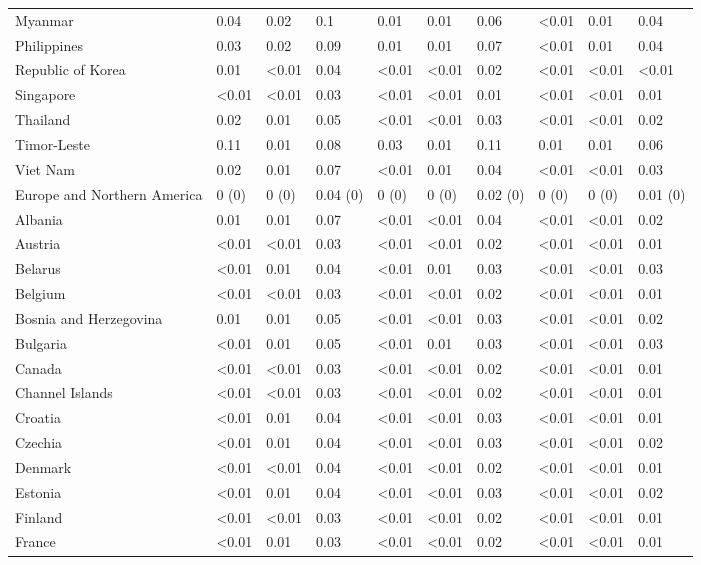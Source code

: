 \begin{longtable}[t]{llllllllll}
Myanmar & 0.04 & 0.02 & 0.1 & 0.01 & 0.01 & 0.06 & <0.01 & 0.01 & 0.04\\
Philippines & 0.03 & 0.02 & 0.09 & 0.01 & 0.01 & 0.07 & <0.01 & 0.01 & 0.04\\
Republic of Korea & 0.01 & <0.01 & 0.04 & <0.01 & <0.01 & 0.02 & <0.01 & <0.01 & <0.01\\
Singapore & <0.01 & <0.01 & 0.03 & <0.01 & <0.01 & 0.01 & <0.01 & <0.01 & 0.01\\
\addlinespace
Thailand & 0.02 & 0.01 & 0.05 & <0.01 & <0.01 & 0.03 & <0.01 & <0.01 & 0.02\\
Timor-Leste & 0.11 & 0.01 & 0.08 & 0.03 & 0.01 & 0.11 & 0.01 & 0.01 & 0.06\\
Viet Nam & 0.02 & 0.01 & 0.07 & <0.01 & 0.01 & 0.04 & <0.01 & <0.01 & 0.03\\
Europe and Northern America & 0 (0) & 0 (0) & 0.04 (0) & 0 (0) & 0 (0) & 0.02 (0) & 0 (0) & 0 (0) & 0.01 (0)\\
Albania & 0.01 & 0.01 & 0.07 & <0.01 & <0.01 & 0.04 & <0.01 & <0.01 & 0.02\\
\addlinespace
Austria & <0.01 & <0.01 & 0.03 & <0.01 & <0.01 & 0.02 & <0.01 & <0.01 & 0.01\\
Belarus & <0.01 & 0.01 & 0.04 & <0.01 & 0.01 & 0.03 & <0.01 & <0.01 & 0.03\\
Belgium & <0.01 & <0.01 & 0.03 & <0.01 & <0.01 & 0.02 & <0.01 & <0.01 & 0.01\\
Bosnia and Herzegovina & 0.01 & 0.01 & 0.05 & <0.01 & <0.01 & 0.03 & <0.01 & <0.01 & 0.02\\
Bulgaria & <0.01 & 0.01 & 0.05 & <0.01 & 0.01 & 0.03 & <0.01 & <0.01 & 0.03\\
\addlinespace
Canada & <0.01 & <0.01 & 0.03 & <0.01 & <0.01 & 0.02 & <0.01 & <0.01 & 0.01\\
Channel Islands & <0.01 & <0.01 & 0.03 & <0.01 & <0.01 & 0.02 & <0.01 & <0.01 & 0.01\\
Croatia & <0.01 & 0.01 & 0.04 & <0.01 & <0.01 & 0.03 & <0.01 & <0.01 & 0.01\\
Czechia & <0.01 & 0.01 & 0.04 & <0.01 & <0.01 & 0.03 & <0.01 & <0.01 & 0.02\\
Denmark & <0.01 & <0.01 & 0.04 & <0.01 & <0.01 & 0.02 & <0.01 & <0.01 & 0.01\\
\addlinespace
Estonia & <0.01 & 0.01 & 0.04 & <0.01 & <0.01 & 0.03 & <0.01 & <0.01 & 0.02\\
Finland & <0.01 & <0.01 & 0.03 & <0.01 & <0.01 & 0.02 & <0.01 & <0.01 & 0.01\\
France & <0.01 & 0.01 & 0.03 & <0.01 & <0.01 & 0.02 & <0.01 & <0.01 & 0.01\\

\end{longtable}
